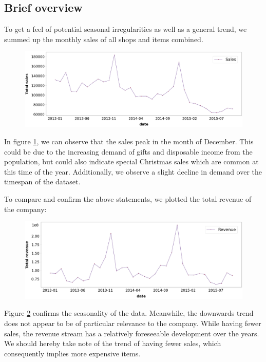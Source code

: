 \subsection{Brief overview}

To get a feel of potential seasonal irregularities as well as a general trend, we summed up the monthly sales of all shops and items combined.

\begin{figure}[h]
  \centering
  \includegraphics[width=0.86\linewidth]{external_content/graphs/total_sales.png}
  \captionsetup{justification=centering}
  \label{fig:total_sales}
\end{figure}


In figure \ref{fig:total_sales}, we can observe that the sales peak in the month of December. This could be due to the increasing demand of gifts and disposable income from the population, but could also indicate special Christmas sales which are common at this time of the year. Additionally, we observe a slight decline in demand over the timespan of the dataset.

To compare and confirm the above statements, we plotted the total revenue of the company:

\begin{figure}[h]
  \centering
  \includegraphics[width=0.9\linewidth]{external_content/graphs/total_revenue.png}
  \captionsetup{justification=centering}
  \label{fig:total_revenue}
\end{figure}

Figure \ref{fig:total_revenue} confirms the seasonality of the data. Meanwhile, the downwards trend does not appear to be of particular relevance to the company.
While having fewer sales, the revenue stream has a relatively foreseeable development over the years. We should hereby take note of the trend of having fewer sales, which consequently implies more expensive items.

